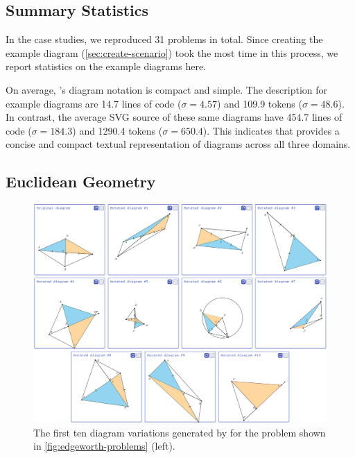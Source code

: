 
\subsection{Summary Statistics}
\label{sec:edgeworth-case-studies-summary}

In the case studies, we reproduced 31 problems in total. Since creating the example diagram (\cref{sec:create-scenario}) took the most time in this process, we report statistics on the example diagrams here. 

On average, \Edgeworth's diagram notation is compact and simple. The description for example diagrams are 14.7 lines of code ($\sigma = 4.57$) and 109.9 tokens ($\sigma = 48.6$). In contrast, the average SVG source of these same diagrams have 454.7 lines of code ($\sigma = 184.3$) and 1290.4 tokens ($\sigma = 650.4$). This indicates that \Edgeworth provides a concise and compact textual representation of diagrams across all three domains.

\subsection{Euclidean Geometry}
\label{sec:edgeworth-geometry}

\begin{figure}[h]
    \centering
    \includegraphics[width=\linewidth]{assets/chapter-3/geometry-grid.png}
    \caption{\textmd{The first ten diagram variations generated by \Edgeworth for the problem shown in \cref{fig:edgeworth-problems} (left).}}
    \label{fig:geometry-grid}
\end{figure}

